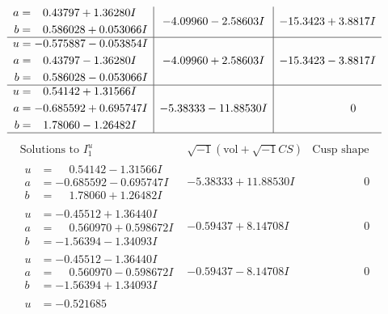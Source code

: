 \documentclass[1p]{elsarticle_modified}
\theoremstyle{definition}
\newcommand{\I}{\sqrt{-1}}
\begin{document}
$$\begin{array}{c|c|c}
\begin{aligned}
a &= \phantom{-}0.43797 + 1.36280 I \\
b &= \phantom{-}0.586028 + 0.053066 I\end{aligned}
 & -4.09960 - 2.58603 I & -15.3423 + 3.8817 I \\ \hline\begin{aligned}
u &= -0.575887 - 0.053854 I \\
a &= \phantom{-}0.43797 - 1.36280 I \\
b &= \phantom{-}0.586028 - 0.053066 I\end{aligned}
 & -4.09960 + 2.58603 I & -15.3423 - 3.8817 I \\ \hline\begin{aligned}
u &= \phantom{-}0.54142 + 1.31566 I \\
a &= -0.685592 + 0.695747 I \\
b &= \phantom{-}1.78060 - 1.26482 I\end{aligned}
 & -5.38333 - 11.88530 I & \phantom{-0.000000 } 0\\
 \hline 
 \end{array}$$\newpage$$\begin{array}{c|c|c}  
\text{Solutions to }I^u_{1}& \I (\text{vol} + \sqrt{-1}CS) & \text{Cusp shape}\\
 \hline 
\begin{aligned}
u &= \phantom{-}0.54142 - 1.31566 I \\
a &= -0.685592 - 0.695747 I \\
b &= \phantom{-}1.78060 + 1.26482 I\end{aligned}
 & -5.38333 + 11.88530 I & \phantom{-0.000000 } 0 \\ \hline\begin{aligned}
u &= -0.45512 + 1.36440 I \\
a &= \phantom{-}0.560970 + 0.598672 I \\
b &= -1.56394 - 1.34093 I\end{aligned}
 & -0.59437 + 8.14708 I & \phantom{-0.000000 } 0 \\ \hline\begin{aligned}
u &= -0.45512 - 1.36440 I \\
a &= \phantom{-}0.560970 - 0.598672 I \\
b &= -1.56394 + 1.34093 I\end{aligned}
 & -0.59437 - 8.14708 I & \phantom{-0.000000 } 0 \\ \hline\begin{aligned}
u &= -0.521685\phantom{ +0.000000I} \\

\end{aligned}
\end{array}$$
\end{document}
